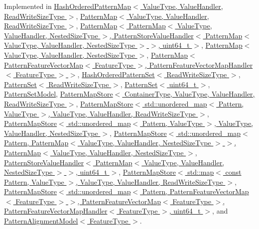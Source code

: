 Implemented in \hyperlink{classHashOrderedPatternMap_a8682c2810f85d0c80ed015e388b571ef}{Hash\+Ordered\+Pattern\+Map$<$ Value\+Type, Value\+Handler, Read\+Write\+Size\+Type $>$}, \hyperlink{classPatternMap_a038d49e8aed58a207c3e106b086cdab0}{Pattern\+Map$<$ Value\+Type, Value\+Handler, Read\+Write\+Size\+Type $>$}, \hyperlink{classPatternMap_a038d49e8aed58a207c3e106b086cdab0}{Pattern\+Map$<$ Pattern\+Map$<$ Value\+Type, Value\+Handler, Nested\+Size\+Type $>$, Pattern\+Store\+Value\+Handler$<$ Pattern\+Map$<$ Value\+Type, Value\+Handler, Nested\+Size\+Type $>$ $>$, uint64\+\_\+t $>$}, \hyperlink{classPatternMap_a038d49e8aed58a207c3e106b086cdab0}{Pattern\+Map$<$ Value\+Type, Value\+Handler, Nested\+Size\+Type $>$}, \hyperlink{classPatternMap_a038d49e8aed58a207c3e106b086cdab0}{Pattern\+Map$<$ Pattern\+Feature\+Vector\+Map$<$ Feature\+Type $>$, Pattern\+Feature\+Vector\+Map\+Handler$<$ Feature\+Type $>$ $>$}, \hyperlink{classHashOrderedPatternSet_ac21ec186302af16a3b70c5c85e434510}{Hash\+Ordered\+Pattern\+Set$<$ Read\+Write\+Size\+Type $>$}, \hyperlink{classPatternSet_a25e9ec9ca33750f21dd729cd2462d925}{Pattern\+Set$<$ Read\+Write\+Size\+Type $>$}, \hyperlink{classPatternSet_a25e9ec9ca33750f21dd729cd2462d925}{Pattern\+Set$<$ uint64\+\_\+t $>$}, \hyperlink{classPatternSetModel_a8821cf7c6d469d0978e32e5ed9cfcda0}{Pattern\+Set\+Model}, \hyperlink{classPatternMapStore_ad9c07c57785e95edbe057e79f94be2c9}{Pattern\+Map\+Store$<$ Container\+Type, Value\+Type, Value\+Handler, Read\+Write\+Size\+Type $>$}, \hyperlink{classPatternMapStore_ad9c07c57785e95edbe057e79f94be2c9}{Pattern\+Map\+Store$<$ std\+::unordered\+\_\+map$<$ Pattern, Value\+Type $>$, Value\+Type, Value\+Handler, Read\+Write\+Size\+Type $>$}, \hyperlink{classPatternMapStore_ad9c07c57785e95edbe057e79f94be2c9}{Pattern\+Map\+Store$<$ std\+::unordered\+\_\+map$<$ Pattern, Value\+Type $>$, Value\+Type, Value\+Handler, Nested\+Size\+Type $>$}, \hyperlink{classPatternMapStore_ad9c07c57785e95edbe057e79f94be2c9}{Pattern\+Map\+Store$<$ std\+::unordered\+\_\+map$<$ Pattern, Pattern\+Map$<$ Value\+Type, Value\+Handler, Nested\+Size\+Type $>$ $>$, Pattern\+Map$<$ Value\+Type, Value\+Handler, Nested\+Size\+Type $>$, Pattern\+Store\+Value\+Handler$<$ Pattern\+Map$<$ Value\+Type, Value\+Handler, Nested\+Size\+Type $>$ $>$, uint64\+\_\+t $>$}, \hyperlink{classPatternMapStore_ad9c07c57785e95edbe057e79f94be2c9}{Pattern\+Map\+Store$<$ std\+::map$<$ const Pattern, Value\+Type $>$, Value\+Type, Value\+Handler, Read\+Write\+Size\+Type $>$}, \hyperlink{classPatternMapStore_ad9c07c57785e95edbe057e79f94be2c9}{Pattern\+Map\+Store$<$ std\+::unordered\+\_\+map$<$ Pattern, Pattern\+Feature\+Vector\+Map$<$ Feature\+Type $>$ $>$, Pattern\+Feature\+Vector\+Map$<$ Feature\+Type $>$, Pattern\+Feature\+Vector\+Map\+Handler$<$ Feature\+Type $>$, uint64\+\_\+t $>$}, and \hyperlink{classPatternAlignmentModel_a4822a730be0dabeebd06771c803b8254}{Pattern\+Alignment\+Model$<$ Feature\+Type $>$}.

